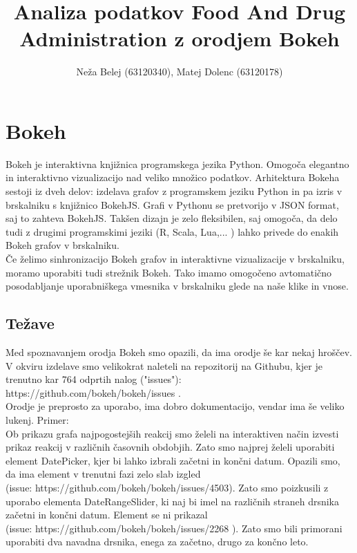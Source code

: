 \documentclass[a4paper,10pt]{article}
\title{Analiza podatkov Food And Drug Administration z orodjem Bokeh}
\author{Neža Belej (63120340), Matej Dolenc (63120178)}
\begin{document}
\maketitle
\section {Bokeh}
Bokeh je interaktivna knjižnica programskega jezika Python. Omogoča elegantno in interaktivno vizualizacijo nad veliko množico podatkov.
Arhitektura Bokeha sestoji iz dveh delov: izdelava grafov z programskem jeziku Python in pa izris v brskalniku s knjižnico BokehJS. Grafi v Pythonu se pretvorijo v JSON format, saj to zahteva BokehJS. Takšen dizajn je zelo fleksibilen, saj omogoča, da delo tudi z drugimi programskimi jeziki (R, Scala, Lua,... ) lahko privede do enakih Bokeh grafov v brskalniku. \\
Če želimo sinhronizacijo Bokeh grafov in interaktivne vizualizacije v brskalniku, moramo uporabiti tudi strežnik Bokeh. Tako imamo omogočeno avtomatično posodabljanje uporabniškega vmesnika v brskalniku glede na naše klike in vnose.

\subsection{Težave}
Med spoznavanjem orodja Bokeh smo opazili, da ima orodje še kar nekaj hroščev. V okviru izdelave smo velikokrat naleteli na repozitorij na Githubu, kjer je trenutno kar 764 odprtih nalog ("issues"): \\ https://github.com/bokeh/bokeh/issues . \\Orodje je preprosto za uporabo, ima dobro dokumentacijo, vendar ima še veliko lukenj. Primer: \\
Ob prikazu grafa najpogostejših reakcij smo želeli na interaktiven način izvesti prikaz reakcij v različnih časovnih obdobjih.
Zato smo najprej želeli uporabiti element DatePicker, kjer bi lahko izbrali začetni in končni datum. Opazili smo, da ima element v trenutni fazi zelo slab izgled \\  (issue: https://github.com/bokeh/bokeh/issues/4503). Zato smo poizkusili z uporabo elementa DateRangeSlider, ki naj bi imel na različnih straneh drsnika začetni in končni datum. Element se ni prikazal \\ (issue: https://github.com/bokeh/bokeh/issues/2268 ). Zato smo bili primorani uporabiti dva navadna drsnika, enega za začetno, drugo za končno leto. 
\end{document}
